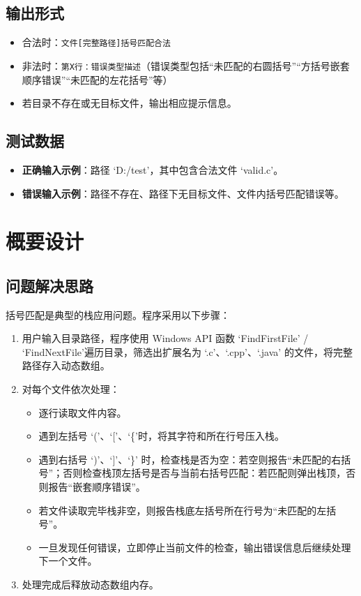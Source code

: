 \documentclass[UTF8]{ctexart}
\begin{document}
\subsection{输出形式}
\begin{itemize}
    \item 合法时：\texttt{文件[完整路径]括号匹配合法}
    \item 非法时：\texttt{第X行：错误类型描述}（错误类型包括“未匹配的右圆括号”“方括号嵌套顺序错误”“未匹配的左花括号”等）
    \item 若目录不存在或无目标文件，输出相应提示信息。
\end{itemize}

\subsection{测试数据}
\begin{itemize}
    \item \textbf{正确输入示例}：路径 ‘D:/test’，其中包含合法文件 ‘valid.c’。
    \item \textbf{错误输入示例}：路径不存在、路径下无目标文件、文件内括号匹配错误等。
\end{itemize}

\section{概要设计}

\subsection{问题解决思路}
括号匹配是典型的栈应用问题。程序采用以下步骤：
\begin{enumerate}
    \item 用户输入目录路径，程序使用 Windows API 函数 ‘FindFirstFile’ / ‘FindNextFile’遍历目录，筛选出扩展名为 ‘.c’、‘.cpp’、‘.java’ 的文件，将完整路径存入动态数组。
    \item 对每个文件依次处理：
        \begin{itemize}
            \item 逐行读取文件内容。
            \item 遇到左括号 ‘(’、‘[’、‘\{’时，将其字符和所在行号压入栈。
            \item 遇到右括号 ‘)’、‘]’、‘\}’ 时，检查栈是否为空：若空则报告“未匹配的右括号”；否则检查栈顶左括号是否与当前右括号匹配：若匹配则弹出栈顶，否则报告“嵌套顺序错误”。
            \item 若文件读取完毕栈非空，则报告栈底左括号所在行号为“未匹配的左括号”。
            \item 一旦发现任何错误，立即停止当前文件的检查，输出错误信息后继续处理下一个文件。
        \end{itemize}
    \item 处理完成后释放动态数组内存。
\end{enumerate}
\end{document}
